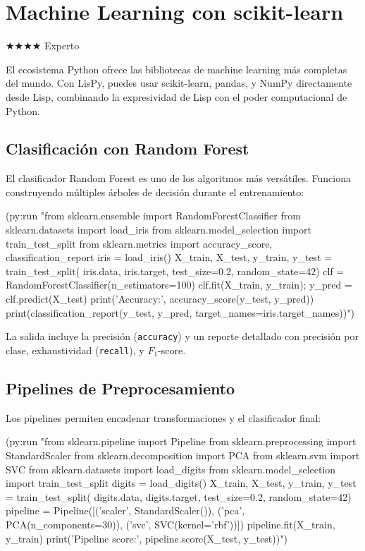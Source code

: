 \chapter{Machine Learning con scikit-learn}
\label{chap:machine-learning}
{\huge$\bigstar$}{\huge$\bigstar$}{\huge$\bigstar$}{\huge$\bigstar$} Experto

El ecosistema Python ofrece las bibliotecas de machine learning más completas
del mundo. Con LisPy, puedes usar scikit-learn, pandas, y NumPy directamente
desde Lisp, combinando la expresividad de Lisp con el poder computacional
de Python.

\section{Clasificación con Random Forest}

El clasificador Random Forest es uno de los algoritmos más versátiles.
Funciona construyendo múltiples árboles de decisión durante el entrenamiento:

\begin{lispcode}
(py:run "from sklearn.ensemble import RandomForestClassifier
from sklearn.datasets import load_iris
from sklearn.model_selection import train_test_split
from sklearn.metrics import accuracy_score, classification_report
iris = load_iris()
X_train, X_test, y_train, y_test = train_test_split(
    iris.data, iris.target, test_size=0.2, random_state=42)
clf = RandomForestClassifier(n_estimators=100)
clf.fit(X_train, y_train); y_pred = clf.predict(X_test)
print('Accuracy:', accuracy_score(y_test, y_pred))
print(classification_report(y_test, y_pred, target_names=iris.target_names))")
\end{lispcode}

La salida incluye la precisión (\texttt{accuracy}) y un reporte detallado
con precisión por clase, exhaustividad (\texttt{recall}), y $F_1$-score.

\section{Pipelines de Preprocesamiento}

Los pipelines permiten encadenar transformaciones y el clasificador final:

\begin{lispcode}
(py:run "from sklearn.pipeline import Pipeline
from sklearn.preprocessing import StandardScaler
from sklearn.decomposition import PCA
from sklearn.svm import SVC
from sklearn.datasets import load_digits
from sklearn.model_selection import train_test_split
digits = load_digits()
X_train, X_test, y_train, y_test = train_test_split(
    digits.data, digits.target, test_size=0.2, random_state=42)
pipeline = Pipeline([('scaler', StandardScaler()),
                     ('pca', PCA(n_components=30)),
                     ('svc', SVC(kernel='rbf'))])
pipeline.fit(X_train, y_train)
print('Pipeline score:', pipeline.score(X_test, y_test))")
\end{lispcode}

